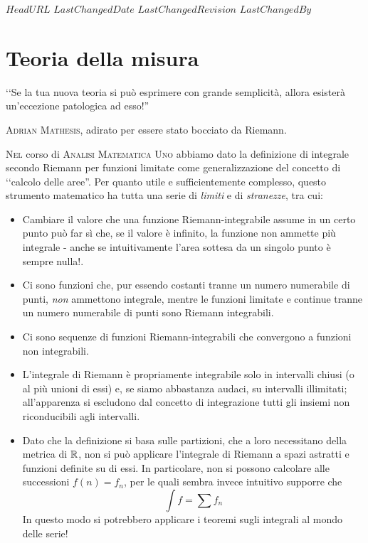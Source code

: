 \svnidlong
{$HeadURL$}
{$LastChangedDate$}
{$LastChangedRevision$}
{$LastChangedBy$}

\chapter{Teoria della misura}

\begin{introduction}
	‘‘Se la tua nuova teoria si può esprimere con grande semplicità, allora esisterà un'eccezione patologica ad esso!''
\begin{flushright}
	\textsc{Adrian Mathesis,} adirato per essere stato bocciato da Riemann.
\end{flushright}
\end{introduction}
\lettrine[findent=1pt, nindent=0pt]{N}{el} corso di \textsc{Analisi Matematica Uno} abbiamo dato la definizione di integrale secondo Riemann per funzioni limitate come generalizzazione del concetto di ‘‘calcolo delle aree''. Per quanto utile e sufficientemente complesso, questo strumento matematico ha tutta una serie di \textit{limiti} e di \textit{stranezze}, tra cui:
\begin{itemize}
	\item Cambiare il valore che una funzione Riemann-integrabile assume in un certo punto può far sì che, se il valore è infinito, la funzione non ammette più integrale - anche se intuitivamente l'area sottesa da un singolo punto è sempre nulla!.
	\item Ci sono funzioni che, pur essendo costanti tranne un numero numerabile di punti, \textit{non} ammettono integrale, mentre le funzioni limitate e continue tranne un numero numerabile di punti sono Riemann integrabili.
	\item Ci sono sequenze di funzioni Riemann-integrabili che convergono a funzioni non integrabili.
	\item L'integrale di Riemann è propriamente integrabile solo in intervalli chiusi (o al più unioni di essi) e, se siamo abbastanza audaci, su intervalli illimitati; all'apparenza si escludono dal concetto di integrazione tutti gli insiemi non riconducibili agli intervalli.
	\item Dato che la definizione si basa sulle partizioni, che a loro necessitano della metrica di $\mathbb{R}$, non si può applicare l'integrale di Riemann a spazi astratti e funzioni definite su di essi. In particolare, non si possono calcolare alle successioni $f(n)=f_n$, per le quali sembra invece intuitivo supporre che
	\begin{equation*}
		\int f=\sum f_n
	\end{equation*}
	In questo modo si potrebbero applicare i teoremi sugli integrali al mondo delle serie! 
\end{itemize}
